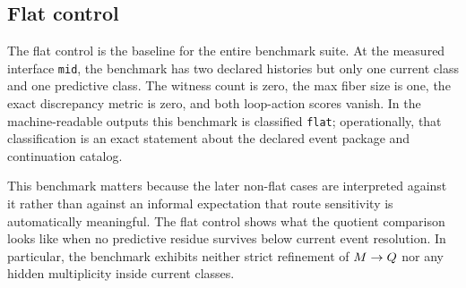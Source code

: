 \documentclass[11pt]{article}
\theoremstyle{definition}
\begin{document}
\begin{table}[H]
\centering
\caption{Exact interface-level metrics for the control-heavy benchmark family at the measured interface \texttt{mid}.}
\label{tab:bench-control-family}
\footnotesize
\setlength{\tabcolsep}{4pt}
\end{table}

\subsection{Flat control}\label{subsec:bench-flat}
The flat control is the baseline for the entire benchmark suite. At the measured interface \texttt{mid}, the benchmark has two declared histories but only one current class and one predictive class. The witness count is zero, the max fiber size is one, the exact discrepancy metric is zero, and both loop-action scores vanish. In the machine-readable outputs this benchmark is classified \texttt{flat}; operationally, that classification is an exact statement about the declared event package and continuation catalog.

This benchmark matters because the later non-flat cases are interpreted against it rather than against an informal expectation that route sensitivity is automatically meaningful. The flat control shows what the quotient comparison looks like when no predictive residue survives below current event resolution. In particular, the benchmark exhibits neither strict refinement of $M \to Q$ nor any hidden multiplicity inside current classes.
\end{document}

